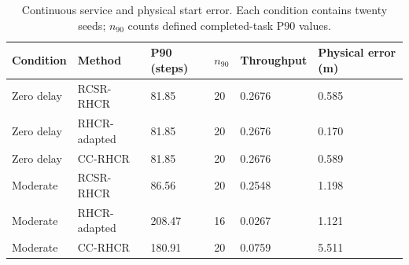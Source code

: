 \begin{table}[!t]
\centering\small
\caption{Continuous service and physical start error. Each condition contains twenty seeds; $n_{90}$ counts defined completed-task P90 values.}
\label{tab:continuous}
\begin{tabular}{llllll}
\toprule
Condition & Method & P90 (steps) & $n_{90}$ & Throughput & Physical error (m) \\ \midrule
Zero delay & RCSR-RHCR & 81.85 & 20 & 0.2676 & 0.585 \\
Zero delay & RHCR-adapted & 81.85 & 20 & 0.2676 & 0.170 \\
Zero delay & CC-RHCR & 81.85 & 20 & 0.2676 & 0.589 \\
Moderate & RCSR-RHCR & 86.56 & 20 & 0.2548 & 1.198 \\
Moderate & RHCR-adapted & 208.47 & 16 & 0.0267 & 1.121 \\
Moderate & CC-RHCR & 180.91 & 20 & 0.0759 & 5.511 \\
\bottomrule
\end{tabular}
\end{table}

